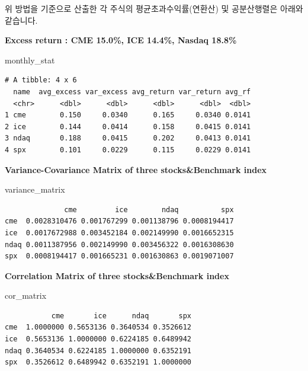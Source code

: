 \documentclass[
  a4paper,
  DIV=11,
  numbers=noendperiod]{scrreprt}
\newenvironment{Shaded}{\begin{snugshade}}{\end{snugshade}}
\newcommand{\NormalTok}[1]{\textcolor[rgb]{0.00,0.23,0.31}{#1}}
\begin{document}
위 방법을 기준으로 산출한 각 주식의 평균초과수익률(연환산) 및
공분산행렬은 아래와 같습니다.

\textbf{Excess return : CME 15.0\%, ICE 14.4\%, Nasdaq 18.8\%}

\begin{Shaded}
\begin{Highlighting}[]
\NormalTok{monthly\_stat}
\end{Highlighting}
\end{Shaded}

\begin{verbatim}
# A tibble: 4 x 6
  name  avg_excess var_excess avg_return var_return avg_rf
  <chr>      <dbl>      <dbl>      <dbl>      <dbl>  <dbl>
1 cme        0.150     0.0340      0.165     0.0340 0.0141
2 ice        0.144     0.0414      0.158     0.0415 0.0141
3 ndaq       0.188     0.0415      0.202     0.0413 0.0141
4 spx        0.101     0.0229      0.115     0.0229 0.0141
\end{verbatim}

\textbf{Variance-Covariance Matrix of three stocks\&Benchmark index}

\begin{Shaded}
\begin{Highlighting}[]
\NormalTok{variance\_matrix}
\end{Highlighting}
\end{Shaded}

\begin{verbatim}
              cme         ice        ndaq          spx
cme  0.0028310476 0.001767299 0.001138796 0.0008194417
ice  0.0017672988 0.003452184 0.002149990 0.0016652315
ndaq 0.0011387956 0.002149990 0.003456322 0.0016308630
spx  0.0008194417 0.001665231 0.001630863 0.0019071007
\end{verbatim}

\textbf{Correlation Matrix of three stocks\&Benchmark index}

\begin{Shaded}
\begin{Highlighting}[]
\NormalTok{cor\_matrix}
\end{Highlighting}
\end{Shaded}

\begin{verbatim}
           cme       ice      ndaq       spx
cme  1.0000000 0.5653136 0.3640534 0.3526612
ice  0.5653136 1.0000000 0.6224185 0.6489942
ndaq 0.3640534 0.6224185 1.0000000 0.6352191
spx  0.3526612 0.6489942 0.6352191 1.0000000
\end{verbatim}
\end{document}
